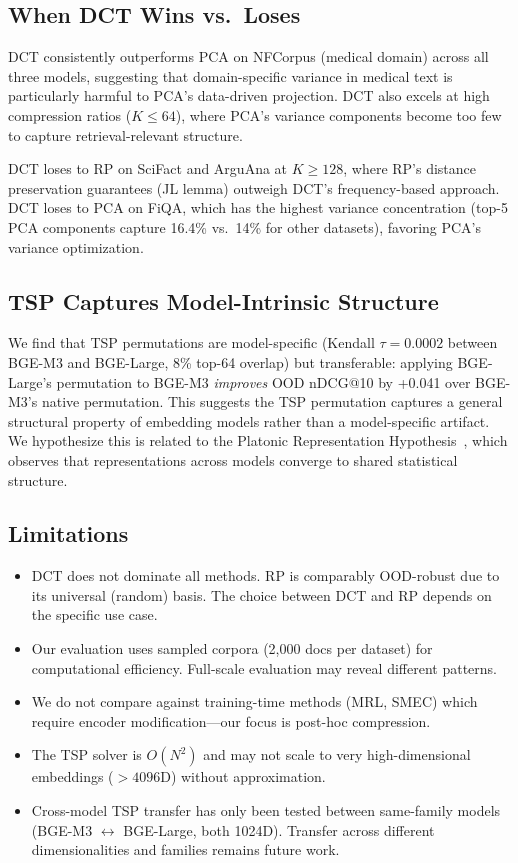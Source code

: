 \documentclass[sigconf]{acmart}
\begin{document}
\subsection{When DCT Wins vs.\ Loses}\label{sec:when_wins}

DCT consistently outperforms PCA on NFCorpus (medical domain) across all three models, suggesting that domain-specific variance in medical text is particularly harmful to PCA's data-driven projection. DCT also excels at high compression ratios ($K \le 64$), where PCA's variance components become too few to capture retrieval-relevant structure.

DCT loses to RP on SciFact and ArguAna at $K \ge 128$, where RP's distance preservation guarantees (JL lemma) outweigh DCT's frequency-based approach. DCT loses to PCA on FiQA, which has the highest variance concentration (top-5 PCA components capture 16.4\% vs.\ 14\% for other datasets), favoring PCA's variance optimization.

\subsection{TSP Captures Model-Intrinsic Structure}\label{sec:model_intrinsic}

We find that TSP permutations are model-specific (Kendall $\tau = 0.0002$ between BGE-M3 and BGE-Large, 8\% top-64 overlap) but transferable: applying BGE-Large's permutation to BGE-M3 \emph{improves} OOD nDCG@10 by +0.041 over BGE-M3's native permutation. This suggests the TSP permutation captures a general structural property of embedding models rather than a model-specific artifact. We hypothesize this is related to the Platonic Representation Hypothesis~\cite{huh2024platonic}, which observes that representations across models converge to shared statistical structure.

\subsection{Limitations}\label{sec:limitations}

\begin{itemize}
    \item DCT does not dominate all methods. RP is comparably OOD-robust due to its universal (random) basis. The choice between DCT and RP depends on the specific use case.
    \item Our evaluation uses sampled corpora (2,000 docs per dataset) for computational efficiency. Full-scale evaluation may reveal different patterns.
    \item We do not compare against training-time methods (MRL, SMEC) which require encoder modification---our focus is post-hoc compression.
    \item The TSP solver is $O(N^2)$ and may not scale to very high-dimensional embeddings ($>4096$D) without approximation.
    \item Cross-model TSP transfer has only been tested between same-family models (BGE-M3 $\leftrightarrow$ BGE-Large, both 1024D). Transfer across different dimensionalities and families remains future work.
\end{itemize}
\end{document}
